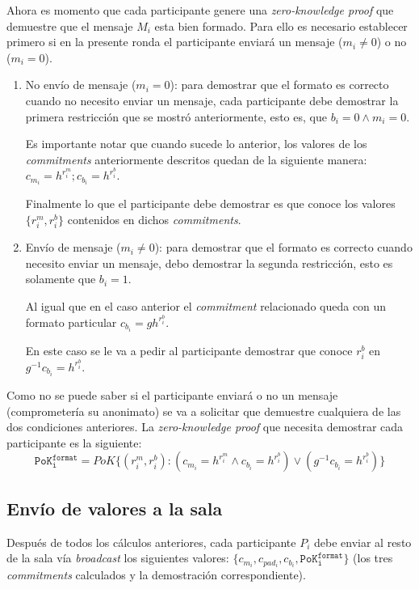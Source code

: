 Ahora es momento que cada participante genere una \emph{zero-knowledge proof} que 
demuestre que el mensaje $M_i$ esta bien formado. Para ello es necesario establecer 
primero si en la presente ronda el participante enviará un mensaje ($m_i \neq 0$) o 
no ($m_i = 0$).

\begin{enumerate}
    \item No envío de mensaje ($m_i = 0$): para demostrar que el formato es correcto 
    cuando no necesito enviar un mensaje, cada participante debe demostrar la primera 
    restricción que se mostró anteriormente, esto es, que $b_i = 0 \land m_i = 0$.
    
    Es importante notar que cuando sucede lo anterior, los valores de los 
    \emph{commitments} anteriormente descritos quedan de la siguiente manera: 
    $c_{m_i} = h^{r_i^m}; c_{b_i} = h^{r_i^b}$.
    
    Finalmente lo que el participante debe demostrar es que conoce los valores 
    $\{r_i^m, r_i^b\}$ contenidos en dichos \emph{commitments}.
    \item Envío de mensaje ($m_i \neq 0$): para demostrar que el formato es 
    correcto cuando necesito enviar un mensaje, debo demostrar la segunda 
    restricción, esto es solamente que $b_i = 1$.
    
    Al igual que en el caso anterior el \emph{commitment} relacionado queda con 
    un formato particular $c_{b_i} = g h^{r_i^b}$.
    
    En este caso se le va a pedir al participante demostrar que conoce $r_i^b$ 
    en $g^{-1} c_{b_i} = h^{r_i^b}$.
\end{enumerate}

Como no se puede saber si el participante enviará o no un mensaje 
(comprometería su anonimato) se va a solicitar que demuestre cualquiera de las 
dos condiciones anteriores. La \emph{zero-knowledge proof} que necesita demostrar 
cada participante es la siguiente: 
$$\mathtt{PoK_i^{format}} = PoK\{(r_i^m, r_i^b) : (c_{m_i} = h^{r_i^m} \land c_{b_i} = h^{r_i^b}) \lor (g^{-1} c_{b_i} = h^{r_i^b})\}$$

\subsection{Envío de valores a la sala}

Después de todos los cálculos anteriores, cada participante $P_i$ debe enviar 
al resto de la sala vía \emph{broadcast} los siguientes valores: 
$\{c_{m_i}, c_{pad_i}, c_{b_i}, \mathtt{PoK_i^{format}}\}$ (los tres \emph{commitments} 
calculados y la demostración correspondiente).

